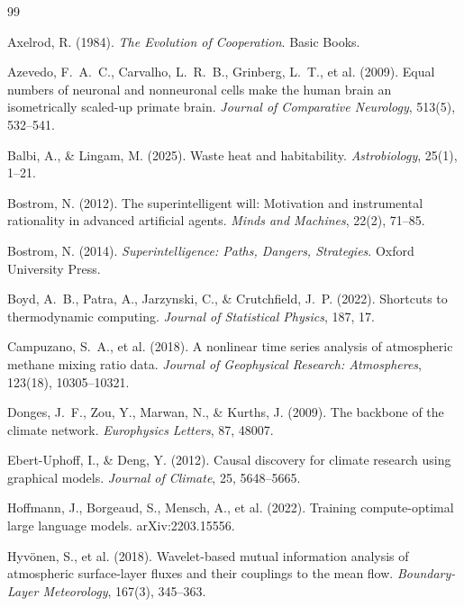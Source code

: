\documentclass[11pt,a4paper,twocolumn]{article}
\begin{document}
\small
\begin{thebibliography}{99}

 Axelrod, R. (1984). \textit{The Evolution of Cooperation}. Basic Books.

 Azevedo, F.~A.~C., Carvalho, L.~R.~B., Grinberg, L.~T., et al. (2009). Equal numbers of neuronal and nonneuronal cells make the human brain an isometrically scaled-up primate brain. \textit{Journal of Comparative Neurology}, 513(5), 532--541.

 Balbi, A., \& Lingam, M. (2025). Waste heat and habitability. \textit{Astrobiology}, 25(1), 1--21.

 Bostrom, N. (2012). The superintelligent will: Motivation and instrumental rationality in advanced artificial agents. \textit{Minds and Machines}, 22(2), 71--85.

 Bostrom, N. (2014). \textit{Superintelligence: Paths, Dangers, Strategies}. Oxford University Press.

 Boyd, A.~B., Patra, A., Jarzynski, C., \& Crutchfield, J.~P. (2022). Shortcuts to thermodynamic computing. \textit{Journal of Statistical Physics}, 187, 17.

 Campuzano, S.~A., et al. (2018). A nonlinear time series analysis of atmospheric methane mixing ratio data. \textit{Journal of Geophysical Research: Atmospheres}, 123(18), 10305--10321.

 Donges, J.~F., Zou, Y., Marwan, N., \& Kurths, J. (2009). The backbone of the climate network. \textit{Europhysics Letters}, 87, 48007.

 Ebert-Uphoff, I., \& Deng, Y. (2012). Causal discovery for climate research using graphical models. \textit{Journal of Climate}, 25, 5648--5665.

 Hoffmann, J., Borgeaud, S., Mensch, A., et al. (2022). Training compute-optimal large language models. arXiv:2203.15556.

 Hyv\"{o}nen, S., et al. (2018). Wavelet-based mutual information analysis of atmospheric surface-layer fluxes and their couplings to the mean flow. \textit{Boundary-Layer Meteorology}, 167(3), 345--363.


\end{thebibliography}
\end{document}
